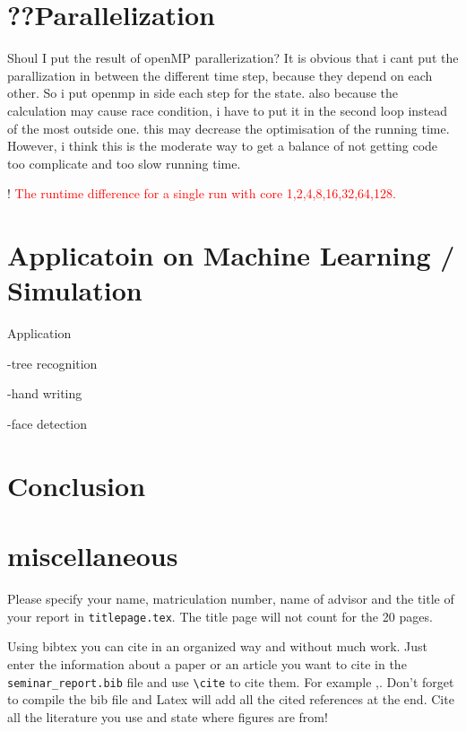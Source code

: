 \documentclass[twoside,a4paper,article]{combine}
\begin{document}
\section{??Parallelization}
	\textcolor{light-gray}{Shoul I put the result of openMP parallerization?}
	It is obvious that i cant put the parallization in between the different time step, because they depend on each other. So i put openmp in side each step for the state. also because the calculation may cause race condition, i have to put it in the second loop instead of the most outside one. this may decrease the optimisation of the running time. However, i think this is the moderate way to get a balance of not getting code too complicate and too slow running time.
	
	! \textcolor{red}{The runtime difference for a single run with core 1,2,4,8,16,32,64,128.}

	
\section{Applicatoin on Machine Learning / Simulation}
	
	\cite{Adachi2015}
	\cite{Benedetti2016}
	\cite{Boyda2017}
	\cite{OMalley2017}
	\cite{Potok2017}
	
	
	Application
	 
	-tree recognition
	
	-hand writing
	
	-face detection
	


\section{Conclusion}
\section{miscellaneous}


\label{section}

Please specify your name, matriculation number, name of advisor and the title of your report in \linebreak
\verb+titlepage.tex+.
The title page will not count for the 20 pages.

Using bibtex you can cite in an organized way and without much work.
Just enter the information about a paper or an article you want to cite in the \verb+seminar_report.bib+ file and use \verb+\cite+ to cite them. For example \cite{Author08CVPR},\cite{Author04IJCV}.
Don't forget to compile the bib file and Latex will add all the cited references at the end.
Cite all the literature you use and state where figures are from!
\end{document}
